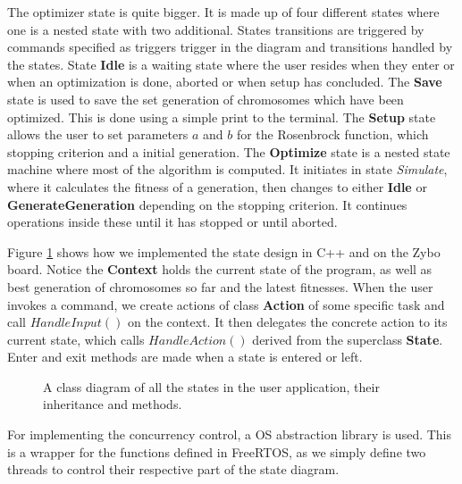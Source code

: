 The optimizer state is quite bigger. It is made up of four different states where one is a nested state with two additional.
States transitions are triggered by commands specified as triggers trigger in the diagram and transitions handled by the states. State \textbf{Idle} is a waiting state where the user resides when they enter or when an optimization is done, aborted or when setup has concluded. The \textbf{Save} state is used to save the set generation of chromosomes which have been optimized. This is done using a simple print to the terminal. The \textbf{Setup} state allows the user to set parameters $a$ and $b$ for the Rosenbrock function, which stopping criterion and a initial generation. The \textbf{Optimize} state is a nested state machine where most of the algorithm is computed. It initiates in state \emph{Simulate}, where it calculates the fitness of a generation, then changes to either \textbf{Idle} or \textbf{GenerateGeneration} depending on the stopping criterion. It continues operations inside these until it has stopped or until aborted.

Figure \ref{fig:classdiagram} shows how we implemented the state design in C++ and on the Zybo board. Notice the \textbf{Context} holds the current state of the program, as well as best generation of chromosomes so far and the latest fitnesses. When the user invokes a command, we create actions of class \textbf{Action} of some specific task and call $HandleInput()$ on the context. It then delegates the concrete action to its current state, which calls $HandleAction()$ derived from the superclass \textbf{State}. Enter and exit methods are made when a state is entered or left.

\begin{figure}[h!]
	\centering
	\caption{A class diagram of all the states in the user application, their inheritance and methods.}
	\label{fig:classdiagram}
\end{figure}

For implementing the concurrency control, a OS abstraction library is used. This is a wrapper for the functions defined in FreeRTOS, as we simply define two threads to control their respective part of the state diagram.


